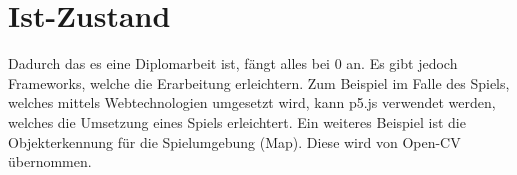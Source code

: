 \section{Ist-Zustand}
Dadurch das es eine Diplomarbeit ist, fängt alles bei 0 an. Es gibt jedoch Frameworks,
welche die Erarbeitung erleichtern. Zum Beispiel im Falle des Spiels, welches
mittels Webtechnologien umgesetzt wird, kann p5.js verwendet werden, welches die
Umsetzung eines Spiels erleichtert. Ein weiteres Beispiel ist die Objekterkennung für
die Spielumgebung (Map). Diese wird von Open-CV übernommen.